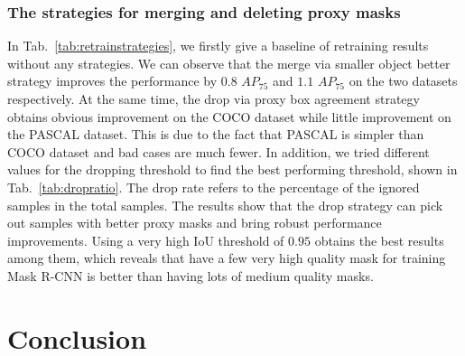 \documentclass[final]{cvpr}
\begin{document}
\vspace{-3mm}
\subsubsection{The strategies for merging and deleting proxy masks}
\vspace{-1mm}

In Tab.~\ref{tab:retrainstrategies}, we firstly give a baseline of retraining results without any strategies. We can observe that the merge via smaller object better strategy improves the performance by $0.8$ $AP_{75}$ and $1.1$ $AP_{75}$ on the two datasets respectively. At the same time, the drop via proxy box agreement strategy obtains obvious improvement on the COCO dataset while little improvement on the PASCAL dataset. This is due to the fact that PASCAL is simpler than COCO dataset and bad cases are much fewer. In addition, we tried different values for the dropping threshold to find the best performing threshold, shown in Tab.~\ref{tab:dropratio}. The drop rate refers to the percentage of the ignored samples in the total samples. The results show that the drop strategy can pick out samples with better proxy masks and bring robust performance improvements. Using a very high IoU threshold of $0.95$ obtains the best results among them, which reveals that have a few very high quality mask for training Mask R-CNN is better than having lots of medium quality masks.



\begin{table}[htbp]
\caption{COCO val results and the ratios of dropped masks when the dropping threshold varies.}
  \centering
\label{tab:dropratio}
\end{table}

\vspace{-3mm}
\section{Conclusion}
\vspace{-1mm}
\end{document}
